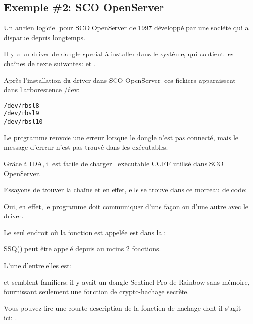 \subsection{Exemple \#2: SCO OpenServer}

\label{examples_SCO}
Un ancien logiciel pour SCO OpenServer de 1997 développé par une société qui a disparue
depuis longtemps.

Il y a un driver de dongle special à installer dans le système, qui contient les
chaînes de texte suivantes:
et
.

Après l'installation du driver dans SCO OpenServer, ces fichiers apparaissent dans
l'arborescence /dev:

\begin{lstlisting}
/dev/rbsl8
/dev/rbsl9
/dev/rbsl10
\end{lstlisting}

Le programme renvoie une erreur lorsque le dongle n'est pas connecté, mais le message
d'erreur n'est pas trouvé dans les exécutables.


Grâce à \ac{IDA}, il est facile de charger l'exécutable COFF utilisé dans SCO OpenServer.

Essayons de trouver la chaîne  et en effet, elle se trouve dans ce morceau
de code:



Oui, en effet, le programme doit communiquer d'une façon ou d'une autre avec le driver.

Le seul endroit où la fonction  est appelée est dans la :



SSQ() peut être appelé depuis au moins 2 fonctions.

L'une d'entre elles est:



 et  semblent familiers: il y avait un dongle Sentinel Pro de
Rainbow sans mémoire, fournissant seulement une fonction de crypto-hachage secrète.

Vous pouvez lire une courte description de la fonction de hachage dont il s'agit
ici: .


